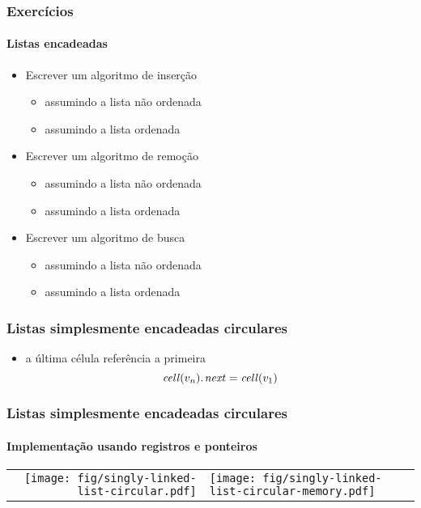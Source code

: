 \documentclass{beamer}
\begin{document}
\begin{frame}

  \frametitle{Exercícios}
  \framesubtitle{Listas encadeadas}

  \begin{itemize}
    \item Escrever um algoritmo de inserção
      \begin{itemize}
        \item assumindo a lista não ordenada
        \item assumindo a lista ordenada
      \end{itemize}
    \item Escrever um algoritmo de remoção
      \begin{itemize}
        \item assumindo a lista não ordenada
        \item assumindo a lista ordenada
      \end{itemize}
    \item Escrever um algoritmo de busca
      \begin{itemize}
        \item assumindo a lista não ordenada
        \item assumindo a lista ordenada
      \end{itemize}
  \end{itemize}

\end{frame}

\begin{frame}

  \frametitle{Listas simplesmente encadeadas circulares}

  \begin{itemize}

    \item a última célula referência a primeira
      $$
      \attrib{\id{cell}(v_n)}{next} = \id{cell}(v_1)
      $$
  \end{itemize}

\end{frame}

\begin{frame}
  \frametitle{Listas simplesmente encadeadas circulares}
  \framesubtitle{Implementação usando registros e ponteiros}

  \begin{center}
    \begin{tabular}{rl}
    \texttt{[image: fig/singly-linked-list-circular.pdf]}
    &
    \texttt{[image: fig/singly-linked-list-circular-memory.pdf]}
    \end{tabular}
  \end{center}

\end{frame}
\end{document}
